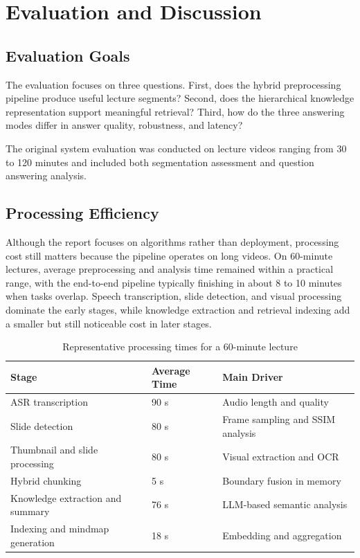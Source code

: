 \section{Evaluation and Discussion}

\subsection{Evaluation Goals}

The evaluation focuses on three questions. First, does the hybrid preprocessing pipeline produce useful lecture segments? Second, does the hierarchical knowledge representation support meaningful retrieval? Third, how do the three answering modes differ in answer quality, robustness, and latency?

The original system evaluation was conducted on lecture videos ranging from 30 to 120 minutes and included both segmentation assessment and question answering analysis.

\subsection{Processing Efficiency}

Although the report focuses on algorithms rather than deployment, processing cost still matters because the pipeline operates on long videos. On 60-minute lectures, average preprocessing and analysis time remained within a practical range, with the end-to-end pipeline typically finishing in about 8 to 10 minutes when tasks overlap. Speech transcription, slide detection, and visual processing dominate the early stages, while knowledge extraction and retrieval indexing add a smaller but still noticeable cost in later stages.

\begin{table}[H]
    \centering
    \caption{Representative processing times for a 60-minute lecture}
    \begin{tabular}{@{}lll@{}}
        \toprule
        \textbf{Stage} & \textbf{Average Time} & \textbf{Main Driver} \\ \midrule
        ASR transcription & 90 s & Audio length and quality \\
        Slide detection & 80 s & Frame sampling and SSIM analysis \\
        Thumbnail and slide processing & 80 s & Visual extraction and OCR \\
        Hybrid chunking & 5 s & Boundary fusion in memory \\
        Knowledge extraction and summary & 76 s & LLM-based semantic analysis \\
        Indexing and mindmap generation & 18 s & Embedding and aggregation \\ \bottomrule
    \end{tabular}
\end{table}

